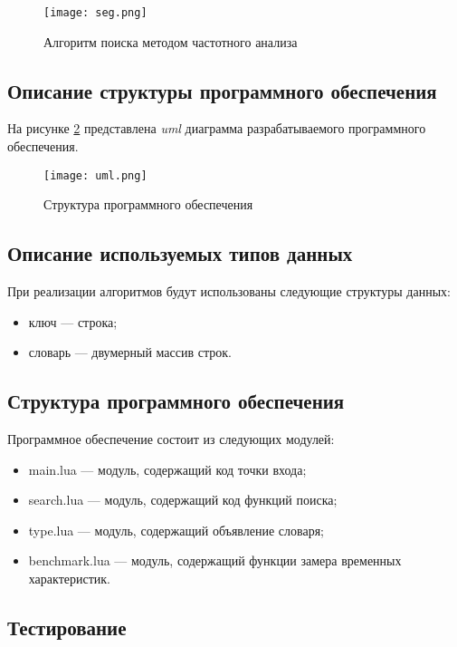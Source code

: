 \begin{figure}[H]
    \centering
    \texttt{[image: seg.png]}
    \caption{Алгоритм поиска методом частотного анализа}
    \label{img:seg}
\end{figure}

\subsection{Описание структуры программного обеспечения}

На рисунке \ref{img:uml} представлена \textit{uml} диаграмма разрабатываемого программного обеспечения.

\begin{figure}[H]
    \centering
    \texttt{[image: uml.png]}
    \caption{Структура программного обеспечения}
    \label{img:uml}
\end{figure}

\subsection{Описание используемых типов данных}

При реализации алгоритмов будут использованы следующие структуры данных:

\begin{itemize}
    \item ключ --- строка;
    \item словарь --- двумерный массив строк.
\end{itemize}

\subsection{Структура программного обеспечения}

Программное обеспечение состоит из следующих модулей:

\begin{itemize}
    \item main.lua --- модуль, содержащий код точки входа;
    \item search.lua --- модуль, содержащий код функций поиска;
    \item type.lua --- модуль, содержащий объявление словаря;
    \item benchmark.lua --- модуль, содержащий функции замера временных характеристик.
\end{itemize}

\subsection{Тестирование}

